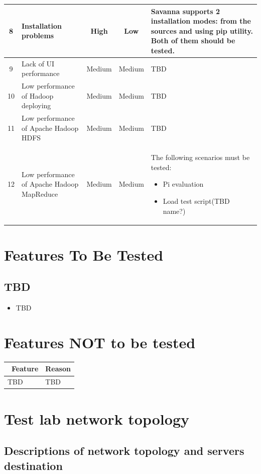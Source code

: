 \documentclass[a4paper,11pt]{article}
\begin{document}
\begin{longtable}{|c|p{3cm}|c|c|p{8cm}|}
8&Installation problems& High &  Low & Savanna supports 2 installation modes: from the sources and using pip utility. Both of them should be tested.\\ \hline
9&Lack of UI performance & Medium & Medium & TBD \\ \hline
10&Low performance of Hadoop deploying & Medium & Medium & TBD\\ \hline
11&Low performance of Apache Hadoop HDFS & Medium & Medium & TBD\\ \hline
12&Low performance of Apache Hadoop MapReduce & Medium & Medium & The following scenarios must be tested:
\begin{itemize}
\item Pi evaluation
\item Load test script(TBD name?)
\end{itemize}
\\ \hline
\end{longtable}

\section{Features To Be Tested}
\subsection{TBD}
\begin{itemize}
\item TBD
\end{itemize} 

\section{Features NOT to be tested}
\begin{tabular}{|p{5cm}|p{10cm}|}
\hline
\ \bf Feature & \bf Reason \\ \hline
TBD&TBD \\ \hline
\end{tabular}


\newpage
\section{Test lab network topology}

\subsection{Descriptions of network topology and servers destination}
\end{document}

